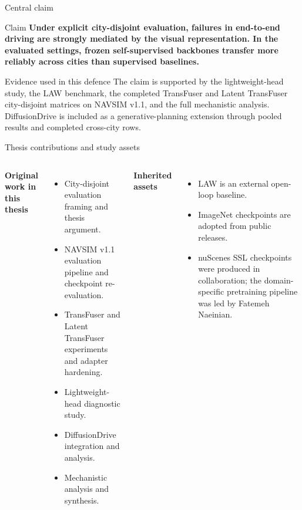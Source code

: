 \documentclass[aspectratio=169, xcolor={table}]{beamer}
\begin{document}
\begin{frame}{Central claim}
  \begin{block}{Claim}
    \textbf{Under explicit city-disjoint evaluation, failures in end-to-end driving are strongly mediated by the visual representation. In the evaluated settings, frozen self-supervised backbones transfer more reliably across cities than supervised baselines.}
  \end{block}
  \vspace{6pt}
  \begin{block}{Evidence used in this defence}
    The claim is supported by the lightweight-head study, the LAW benchmark, the completed TransFuser and Latent TransFuser city-disjoint matrices on NAVSIM v1.1, and the full mechanistic analysis. DiffusionDrive is included as a generative-planning extension through pooled results and completed cross-city rows.
  \end{block}
\end{frame}

\begin{frame}{Thesis contributions and study assets}
  \begin{columns}[T]
    \textbf{Original work in this thesis}
    \begin{itemize}\footnotesize
      \item City-disjoint evaluation framing and thesis argument.
      \item NAVSIM v1.1 evaluation pipeline and checkpoint re-evaluation.
      \item TransFuser and Latent TransFuser experiments and adapter hardening.
      \item Lightweight-head diagnostic study.
      \item DiffusionDrive integration and analysis.
      \item Mechanistic analysis and synthesis.
    \end{itemize}
    \textbf{Inherited assets}
    \begin{itemize}\footnotesize
      \item LAW is an external open-loop baseline.
      \item ImageNet checkpoints are adopted from public releases.
      \item nuScenes SSL checkpoints were produced in collaboration; the domain-specific pretraining pipeline was led by Fatemeh Naeinian.
    \end{itemize}
  \end{columns}
\end{frame}
\end{document}
